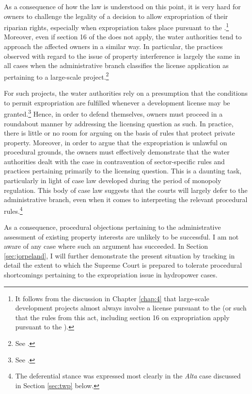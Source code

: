 As a consequence of how the law is understood on this point, it is very hard for owners to challenge the legality of a decision to allow expropriation of their riparian rights, especially when expropriation takes place pursuant to the \cite{wra17}.\footnote{It follows from the discussion in Chapter \ref{chap:4} that large-scale development projects almost always involve a license pursuant to the \cite{wra17} (or such that the rules from this act, including section 16 on expropriation apply pursuant to the \cite{wra00}).} Moreover, even if section 16 of the \cite{wra17} does not apply, the water authorities tend to approach the affected owners in a similar way. In particular, the practices observed with regard to the issue of property interference is largely the same in all cases when the administrative branch classifies the license application as pertaining to a large-scale project.\footnote{See \cite{flatby08}.}

For such projects, the water authorities rely on a presumption that the conditions to permit expropriation are fulfilled whenever a development license may be granted.\footnote{See \cite{flatby08}.} Hence, in order to defend themselves, owners must proceed in a roundabout manner by addressing the licensing question as such. In practice, there is little or no room for arguing on the basis of rules that protect private property.    Moreover, in order to argue that the expropriation is unlawful on procedural grounds, the owners must effectively demonstrate that the water authorities dealt with the case in contravention of sector-specific rules and practices pertaining primarily to the licensing question. This is a daunting task, particularly in light of case law developed during the period of monopoly regulation. This body of case law suggests that the courts will largely defer to the administrative branch, even when it comes to interpreting the relevant procedural rules.\footnote{The deferential stance was expressed most clearly in the {\it Alta} case discussed in Section \ref{sec:twp} below.}

As a consequence, procedural objections pertaining to the administrative assessment of existing property interests are unlikely to be successful. I am not aware of any case where such an argument has succeeded. In Section \ref{sec:jorpeland}, I will further demonstrate the present situation by tracking in detail the extent to which the Supreme Court is prepared to tolerate procedural shortcomings pertaining to the expropriation issue in hydropower cases.%

